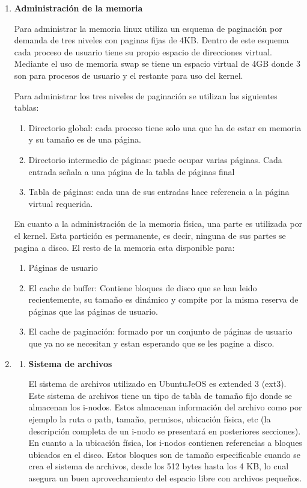 \documentclass[a4paper,11pt] {article}
\begin{document}
\begin{enumerate}
	\item \textbf{Administraci\'on de la memoria}

	Para administrar la memoria linux utiliza un esquema de paginaci\'on por demanda de tres niveles con paginas fijas de 4KB. Dentro de este esquema cada proceso de usuario tiene su propio espacio de direcciones virtual. Mediante el uso de memoria swap se tiene un espacio virtual de 4GB donde 3 son para procesos de usuario y el restante para uso del kernel.
	
	Para administrar los tres niveles de paginaci\'on se utilizan las siguientes tablas:
		\begin{enumerate}
		\item Directorio global: cada proceso tiene solo una que ha de estar en memoria y su tamaño es de una p\'agina.
		\item Directorio intermedio de p\'aginas: puede ocupar varias p\'aginas. Cada entrada señala a una p\'agina de la tabla de p\'aginas final
		\item Tabla de p\'aginas: cada una de sus entradas hace referencia a la p\'agina virtual requerida.
		\end{enumerate}
	En cuanto a la administraci\'on de la memoria f\'isica, una parte es utilizada por el kernel. Esta partici\'on es permanente, es decir, ninguna de sus partes se pagina a disco.
	El resto de la memoria esta disponible para:
		\begin{enumerate}
		\item P\'aginas de usuario
		\item El cache de buffer: Contiene bloques de disco que se han leido recientemente, su tamaño es din\'amico y compite por la misma reserva de p\'aginas que las p\'aginas de usuario.
		\item El cache de paginaci\'on: formado por un conjunto de p\'aginas de usuario que ya no se necesitan y estan esperando que se les pagine a disco.
		\end{enumerate}

	\item 
		\begin{enumerate}
			\item \textbf{Sistema de archivos} 

			El sistema de archivos utilizado en UbuntuJeOS es extended 3 (ext3). Este sistema de archivos tiene un tipo de tabla de tamaño fijo donde se almacenan los i-nodos. Estos almacenan información del archivo como por ejemplo la ruta o path, tamaño, permisos, ubicación física, etc (la descripción completa de un i-nodo se presentará en posteriores secciones). En cuanto a la ubicación física, los i-nodos contienen referencias a bloques ubicados en el disco. Estos bloques son de tamaño especificable cuando se crea el sistema de archivos, desde los 512 bytes hasta los 4 KB, lo cual asegura un buen aprovechamiento del espacio libre con archivos pequeños.


\end{enumerate}
\end{enumerate}
\end{document}
